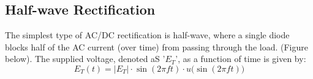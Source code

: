 \documentclass{article}
\begin{document}
	\subsection[HalfWave]{Half-wave Rectification}
	The simplest type of AC/DC rectification is half-wave, where a single diode 
	blocks half of the AC current (over time) from passing through the load. 
	(Figure below).  The supplied voltage, denoted aS '$E_T$', as a function of 
	time is given by:
	$$ E_T(t) = |E_T| \cdot \sin (2 \pi f t) \cdot u\big( \sin(2 \pi f t) \big 
	)$$
\end{document}
